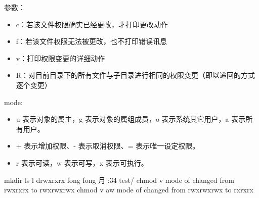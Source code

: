 \documentclass[letterpaper,10pt,english]{sphinxmanual}
\begin{document}
参数：
\begin{itemize}
\item {} 
c：若该文件权限确实已经更改，才打印更改动作

\item {} 
f：若该文件权限无法被更改，也不打印错误讯息

\item {} 
v：打印权限变更的详细动作

\item {} 
R：对目前目录下的所有文件与子目录进行相同的权限变更（即以递回的方式逐个变更）

\end{itemize}

mode:

%
\begin{sphinxVerbatim}[commandchars=\\\{\}]
\PYG{p}{[}\PYG{p}{]} \PYG{p}{[}\PYG{p}{]} \PYG{p}{[}\PYG{p}{]}
\end{sphinxVerbatim}
\begin{itemize}
\item {} 
u 表示对象的属主，g 表示对象的属组成员，o 表示系统其它用户，a 表示所有用户。

\item {} 
+ 表示增加权限、- 表示取消权限、= 表示唯一设定权限。

\item {} 
r 表示可读，w 表示可写，x 表示可执行。

\end{itemize}

%
\begin{sphinxVerbatim}[commandchars=\\\{\},numbers=left,firstnumber=1,stepnumber=1]
\PYGZdl{} mkdir 
\PYGZdl{} ls \PYGZhy{}l
drwxr\PYGZhy{}xr\PYGZhy{}x   fong fong  月    :34 test/
\PYGZdl{} chmod \PYGZhy{}v  
mode of  changed from  rwxr\PYGZhy{}xr\PYGZhy{}x to  rwxrwxrwx
\PYGZdl{} chmod \PYGZhy{}v a\PYGZhy{}w 
mode of  changed from  rwxrwxrwx to  r\PYGZhy{}xr\PYGZhy{}xr\PYGZhy{}x
\end{sphinxVerbatim}
\end{document}

